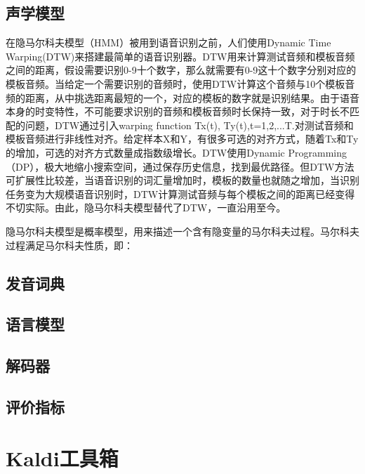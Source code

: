 \subsection{声学模型}
在隐马尔科夫模型（HMM）被用到语音识别之前，人们使用Dynamic Time Warping(DTW)来搭建最简单的语音识别器。DTW用来计算测试音频和模板音频之间的距离，假设需要识别0-9十个数字，那么就需要有0-9这十个数字分别对应的模板音频。当给定一个需要识别的音频时，使用DTW计算这个音频与10个模板音频的距离，从中挑选距离最短的一个，对应的模板的数字就是识别结果。由于语音本身的时变特性，不可能要求识别的音频和模板音频时长保持一致，对于时长不匹配的问题，DTW通过引入warping function Tx(t), Ty(t),t=1,2,...T.对测试音频和模板音频进行非线性对齐。给定样本X和Y，有很多可选的对齐方式，随着Tx和Ty 的增加，可选的对齐方式数量成指数级增长。DTW使用Dynamic Programming（DP），极大地缩小搜索空间，通过保存历史信息，找到最优路径。但DTW方法可扩展性比较差，当语音识别的词汇量增加时，模板的数量也就随之增加，当识别任务变为大规模语音识别时，DTW计算测试音频与每个模板之间的距离已经变得不切实际。由此，隐马尔科夫模型替代了DTW，一直沿用至今。

隐马尔科夫模型是概率模型，用来描述一个含有隐变量的马尔科夫过程。马尔科夫过程满足马尔科夫性质，即：

\subsection{发音词典}

\subsection{语言模型}

\subsection{解码器}

\subsection{评价指标}

\section{Kaldi工具箱}
